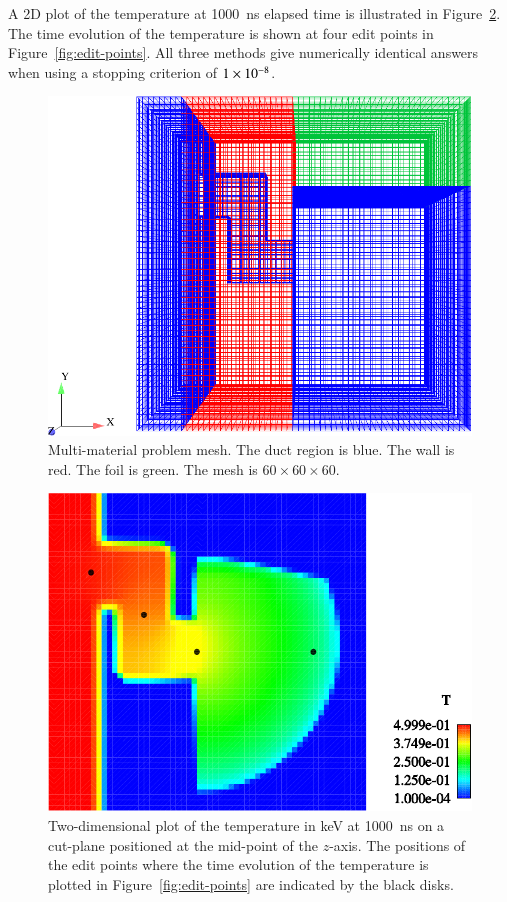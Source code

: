 \documentclass[preprint,12pt]{elsarticle}
\begin{document}
A 2D plot of the temperature at 1000~ns elapsed time is illustrated in
Figure~\ref{fig:multi-mat_T}.  The time evolution of the temperature is shown
at four edit points in Figure~\ref{fig:edit-points}.  All three methods give
numerically identical answers when using a stopping criterion of $1\times 10^{-8}$.
\begin{figure}[ht!]
  \centerline{ \includegraphics[width=5in,clip]{mesh.pdf}}
  \caption{Multi-material problem mesh.  The duct region is blue.  The wall is
    red.  The foil is green.  The mesh is $60\times 60\times 60$.}
  \label{fig:multi-mat-mesh}
\end{figure}

\begin{figure}[ht!]
  \centerline{ \includegraphics[width=5in,clip]{T_multi_mat.pdf}}
  \caption{ Two-dimensional plot of the temperature in keV at 1000~ns
    on a cut-plane positioned at the mid-point of the $z$-axis.  The
    positions of the edit points where the time evolution of the
    temperature is plotted in Figure~\ref{fig:edit-points} are
    indicated by the black disks.}
  \label{fig:multi-mat_T}
\end{figure}
\end{document}
